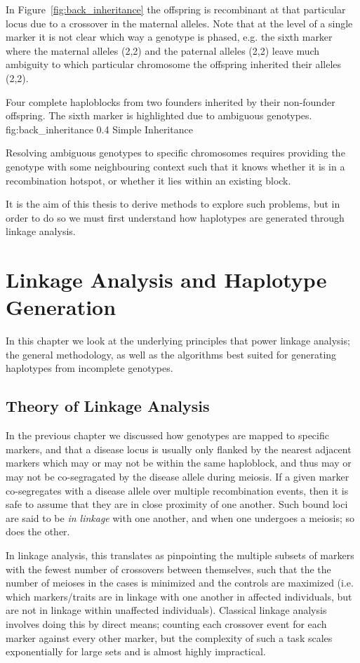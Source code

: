 In Figure~\ref{fig:back_inheritance} the offspring is recombinant at that particular locus due to a crossover in the maternal alleles. Note that at the level of a single marker it is not clear which way a genotype is phased, e.g. the sixth marker where the maternal alleles (2,2) and the paternal alleles (2,2) leave much ambiguity to which particular chromosome the offspring inherited their alleles (2,2).

	{Four complete haploblocks from two founders inherited by their non-founder offspring. The sixth marker is highlighted due to ambiguous genotypes.}
	{fig:back_inheritance}
	{0.4}
	{Simple Inheritance}

Resolving ambiguous genotypes to specific chromosomes requires providing the genotype with some neighbouring context such that it knows whether it is in a recombination hotspot, or whether it lies within an existing block.  

It is the aim of this thesis to derive methods to explore such problems,  but in order to do so we must first understand how haplotypes are generated through linkage analysis.

\section{Linkage Analysis and Haplotype Generation}

In this chapter we look at the underlying principles that power linkage analysis; the general methodology, as well as the algorithms best suited for generating haplotypes from incomplete genotypes.

\subsection{Theory of Linkage Analysis}

In the previous chapter we discussed how genotypes are mapped to specific markers, and that a disease locus is usually only flanked by the nearest adjacent markers which may or may not be within the same haploblock, and thus may or may not be co-segragated by the disease allele during meiosis.
If a given marker co-segregates with a disease allele over multiple recombination events, then it is safe to assume that they are in close proximity of one another. Such bound loci are said to be \textit{in linkage} with one another, and when one undergoes a meiosis; so does the other.

In linkage analysis, this translates as pinpointing the multiple subsets of markers with the fewest number of crossovers between themselves, such that the the number of meioses in the cases is minimized and the controls are maximized (i.e. which markers/traits are in linkage with one another in affected individuals, but are not in linkage within unaffected individuals).
Classical linkage analysis involves doing this by direct means; counting each crossover event for each marker against every other marker, but the complexity of such a task scales exponentially for large sets and is almost highly impractical.

